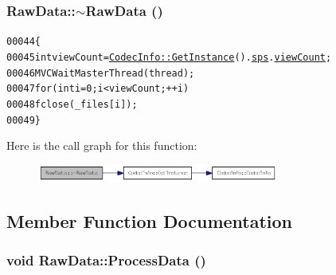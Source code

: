 \hypertarget{class_raw_data_a214d10a81d07c892cb7b35653772e4e4}{
\subsubsection[{$\sim$RawData}]{\setlength{\rightskip}{0pt plus 5cm}RawData::$\sim$RawData ()}}
\label{class_raw_data_a214d10a81d07c892cb7b35653772e4e4}




\begin{footnotesize}\begin{alltt}
00044         \{
00045                 \textcolor{keywordtype}{int} viewCount = \hyperlink{class_codec_info_ad439fd8062a03d868dfe9c9b615b747e}{CodecInfo::GetInstance}().\hyperlink{class_codec_info_aee785011cec77ff3c0c646b498fe1e7d}{sps}.\hyperlink{struct_sequence_parameters_set_af32c7819f630856ccd99aaf78e8f656c}{viewCount};
00046                 MVCWaitMasterThread(thread);
00047                 \textcolor{keywordflow}{for} (\textcolor{keywordtype}{int} i = 0; i < viewCount; ++i)
00048                         fclose(\_files[i]);
00049         \}
\end{alltt}\end{footnotesize}




Here is the call graph for this function:\nopagebreak
\begin{figure}[H]
\begin{center}
\leavevmode
\includegraphics[width=225pt]{class_raw_data_a214d10a81d07c892cb7b35653772e4e4_cgraph}
\end{center}
\end{figure}




\subsection{Member Function Documentation}
\hypertarget{class_raw_data_ac1edea5cb8ba51fd52541b415ba36ec2}{
\subsubsection[{ProcessData}]{\setlength{\rightskip}{0pt plus 5cm}void RawData::ProcessData ()}}
\label{class_raw_data_ac1edea5cb8ba51fd52541b415ba36ec2}





